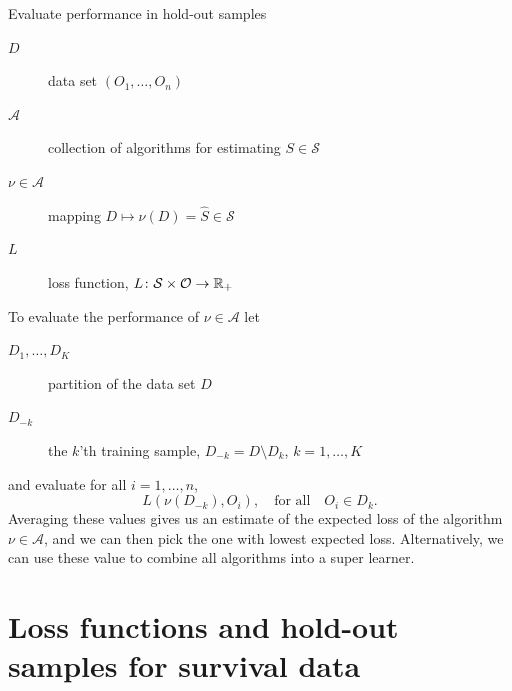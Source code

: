 \documentclass[smaller]{beamer}\usepackage{listings}
\newcommand{\est}{\ensuremath{\nu}}
\begin{document}
\begin{frame}[label={sec:orgc69e91e}]{Evaluate performance in hold-out samples}
\small

\begin{description}
\item[{\(D\)}] data set \((O_1, \dots, O_n)\)
\item[{\(\mathcal{A}\)}] collection of algorithms for estimating \(S \in \mathcal{S}\)
\item[{\(\nu \in \mathcal{A}\)}] mapping \(D \longmapsto \est(D) = \hat S \in
  \mathcal{S}\)
\item[{\(L\)}] loss function, \(L \colon \mathcal{S} \times \mathcal{O} \rightarrow \mathbb{R}_+\)
\end{description}

\vfill
To evaluate the performance of \(\est \in \mathcal{A}\) let
\begin{description}
\item[{\(D_1, \dots, D_K\)}] partition of the data set \(D\)
\item[{\(D_{-k}\)}] the \(k\)'th training sample, \(D_{-k} = D \setminus
  D_{k}\), \(k=1, \dots, K\)
\end{description}

and evaluate for all \(i = 1, \dots, n\),
\begin{equation*}
L(\est(D_{-k}), O_i),
\quad \text{for all} \quad O_i \in D_k.
\end{equation*}
Averaging these values gives us an estimate of the expected loss of the algorithm \(\nu \in
\mathcal{A}\), and we can then pick the one with lowest expected loss. Alternatively, we can use
these value to combine all algorithms into a super learner.
\end{frame}


\section{Loss functions and hold-out samples for survival data}
\label{sec:org88e0534}
\end{document}
